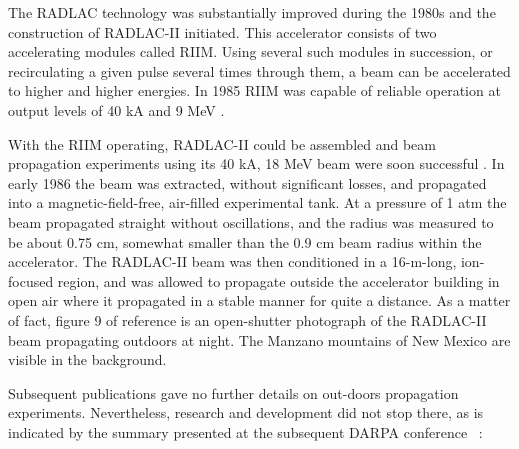\documentclass [12pt,a4paper,     ]{report} %
\begin{document}
   The RADLAC technology was substantially improved during the 1980s and the construction of RADLAC-II initiated. This accelerator consists of two accelerating modules called RIIM.  Using several such modules in succession, or recirculating a given pulse several times through them, a beam can be accelerated to higher and higher energies. In 1985 RIIM was capable of reliable operation at output levels of 40 kA and 9 MeV \cite{MILLE1985-}.

  With the RIIM operating, RADLAC-II could be assembled and beam propagation experiments using its 40 kA, 18 MeV beam were soon successful \cite{MAZAR1986-}.  In early 1986 the beam was extracted, without significant losses, and propagated into a magnetic-field-free, air-filled experimental tank. At a pressure of 1 atm the beam propagated straight without oscillations, and the radius was measured to be about 0.75 cm, somewhat smaller than the 0.9 cm beam radius within the accelerator.  The RADLAC-II beam was then conditioned in a 16-m-long, ion-focused region, and was allowed to propagate outside the accelerator building in open air where it propagated in a stable manner for quite a distance.   As a matter of fact, figure 9 of reference \cite{MAZAR1986-} is an open-shutter photograph of the RADLAC-II beam propagating outdoors at night.  The Manzano mountains of New Mexico are visible in the background.

Subsequent publications gave no further details on out-doors propagation experiments. Nevertheless, research and development did not stop there, as is indicated by the summary presented at the subsequent DARPA conference \cite{HASTI1986-}~:
\end{document}
